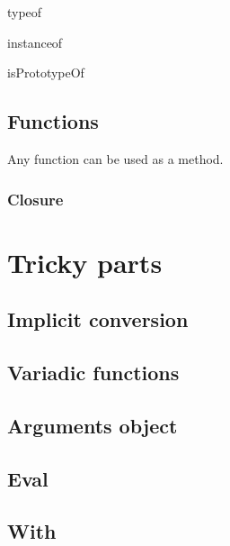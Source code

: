 typeof

instanceof

isPrototypeOf


\subsection{Functions}

Any function can be used as a method.


\subsubsection{Closure}

\section{Tricky parts}

\subsection{Implicit conversion}
\label{sec:implconv}

\subsection{Variadic functions}

\subsection{Arguments object}

\subsection{Eval}

\subsection{With}
